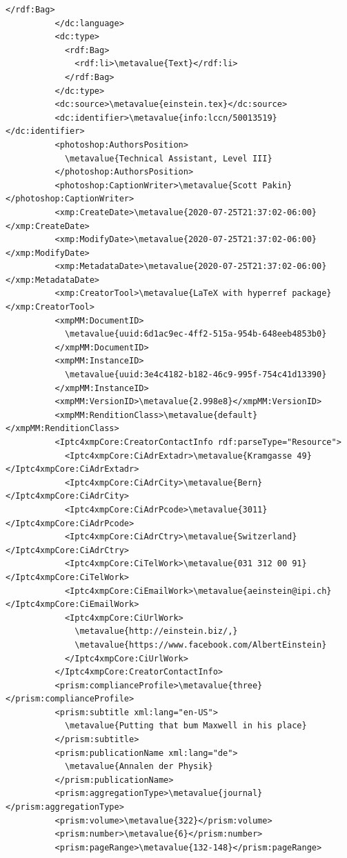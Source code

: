 \begin{Verbatim}[fontsize=\small,commandchars=\\\{\}]
            </rdf:Bag>
          </dc:language>
          <dc:type>
            <rdf:Bag>
              <rdf:li>\metavalue{Text}</rdf:li>
            </rdf:Bag>
          </dc:type>
          <dc:source>\metavalue{einstein.tex}</dc:source>
          <dc:identifier>\metavalue{info:lccn/50013519}</dc:identifier>
          <photoshop:AuthorsPosition>
            \metavalue{Technical Assistant, Level III}
          </photoshop:AuthorsPosition>
          <photoshop:CaptionWriter>\metavalue{Scott Pakin}</photoshop:CaptionWriter>
          <xmp:CreateDate>\metavalue{2020-07-25T21:37:02-06:00}</xmp:CreateDate>
          <xmp:ModifyDate>\metavalue{2020-07-25T21:37:02-06:00}</xmp:ModifyDate>
          <xmp:MetadataDate>\metavalue{2020-07-25T21:37:02-06:00}</xmp:MetadataDate>
          <xmp:CreatorTool>\metavalue{LaTeX with hyperref package}</xmp:CreatorTool>
          <xmpMM:DocumentID>
            \metavalue{uuid:6d1ac9ec-4ff2-515a-954b-648eeb4853b0}
          </xmpMM:DocumentID>
          <xmpMM:InstanceID>
            \metavalue{uuid:3e4c4182-b182-46c9-995f-754c41d13390}
          </xmpMM:InstanceID>
          <xmpMM:VersionID>\metavalue{2.998e8}</xmpMM:VersionID>
          <xmpMM:RenditionClass>\metavalue{default}</xmpMM:RenditionClass>
          <Iptc4xmpCore:CreatorContactInfo rdf:parseType="Resource">
            <Iptc4xmpCore:CiAdrExtadr>\metavalue{Kramgasse 49}</Iptc4xmpCore:CiAdrExtadr>
            <Iptc4xmpCore:CiAdrCity>\metavalue{Bern}</Iptc4xmpCore:CiAdrCity>
            <Iptc4xmpCore:CiAdrPcode>\metavalue{3011}</Iptc4xmpCore:CiAdrPcode>
            <Iptc4xmpCore:CiAdrCtry>\metavalue{Switzerland}</Iptc4xmpCore:CiAdrCtry>
            <Iptc4xmpCore:CiTelWork>\metavalue{031 312 00 91}</Iptc4xmpCore:CiTelWork>
            <Iptc4xmpCore:CiEmailWork>\metavalue{aeinstein@ipi.ch}</Iptc4xmpCore:CiEmailWork>
            <Iptc4xmpCore:CiUrlWork>
              \metavalue{http://einstein.biz/,}
              \metavalue{https://www.facebook.com/AlbertEinstein}
            </Iptc4xmpCore:CiUrlWork>
          </Iptc4xmpCore:CreatorContactInfo>
          <prism:complianceProfile>\metavalue{three}</prism:complianceProfile>
          <prism:subtitle xml:lang="en-US">
            \metavalue{Putting that bum Maxwell in his place}
          </prism:subtitle>
          <prism:publicationName xml:lang="de">
            \metavalue{Annalen der Physik}
          </prism:publicationName>
          <prism:aggregationType>\metavalue{journal}</prism:aggregationType>
          <prism:volume>\metavalue{322}</prism:volume>
          <prism:number>\metavalue{6}</prism:number>
          <prism:pageRange>\metavalue{132-148}</prism:pageRange>

\end{Verbatim}
